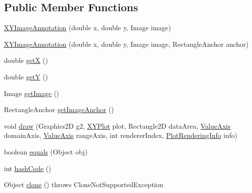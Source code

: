 \subsection*{Public Member Functions}
\begin{DoxyCompactItemize}
\item 
\mbox{\hyperlink{classorg_1_1jfree_1_1chart_1_1annotations_1_1_x_y_image_annotation_a29e84ffa5417925c2b760651d65240c7}{X\+Y\+Image\+Annotation}} (double x, double y, Image image)
\item 
\mbox{\hyperlink{classorg_1_1jfree_1_1chart_1_1annotations_1_1_x_y_image_annotation_a66b091b9414ad06c4276c03c62d2fca5}{X\+Y\+Image\+Annotation}} (double x, double y, Image image, Rectangle\+Anchor anchor)
\item 
double \mbox{\hyperlink{classorg_1_1jfree_1_1chart_1_1annotations_1_1_x_y_image_annotation_ad77b6ae97c4b5eab5f3a0ba95f9331c1}{getX}} ()
\item 
double \mbox{\hyperlink{classorg_1_1jfree_1_1chart_1_1annotations_1_1_x_y_image_annotation_acbc4b1c73134c8c7d7e04c0323c85c42}{getY}} ()
\item 
Image \mbox{\hyperlink{classorg_1_1jfree_1_1chart_1_1annotations_1_1_x_y_image_annotation_a4158e32d650804e61aab81edd3bce15a}{get\+Image}} ()
\item 
Rectangle\+Anchor \mbox{\hyperlink{classorg_1_1jfree_1_1chart_1_1annotations_1_1_x_y_image_annotation_a2149a26b8d4163b1f6ccce3b8ddf9e83}{get\+Image\+Anchor}} ()
\item 
void \mbox{\hyperlink{classorg_1_1jfree_1_1chart_1_1annotations_1_1_x_y_image_annotation_ae60cac497a5354b0640499084046637d}{draw}} (Graphics2D g2, \mbox{\hyperlink{classorg_1_1jfree_1_1chart_1_1plot_1_1_x_y_plot}{X\+Y\+Plot}} plot, Rectangle2D data\+Area, \mbox{\hyperlink{classorg_1_1jfree_1_1chart_1_1axis_1_1_value_axis}{Value\+Axis}} domain\+Axis, \mbox{\hyperlink{classorg_1_1jfree_1_1chart_1_1axis_1_1_value_axis}{Value\+Axis}} range\+Axis, int renderer\+Index, \mbox{\hyperlink{classorg_1_1jfree_1_1chart_1_1plot_1_1_plot_rendering_info}{Plot\+Rendering\+Info}} info)
\item 
boolean \mbox{\hyperlink{classorg_1_1jfree_1_1chart_1_1annotations_1_1_x_y_image_annotation_aec33b4cbf0a993645535408d28692f6b}{equals}} (Object obj)
\item 
int \mbox{\hyperlink{classorg_1_1jfree_1_1chart_1_1annotations_1_1_x_y_image_annotation_acf32ed3da18593fd2d5871c0bfd1ca7b}{hash\+Code}} ()
\item 
Object \mbox{\hyperlink{classorg_1_1jfree_1_1chart_1_1annotations_1_1_x_y_image_annotation_acf5922efb01896ecdd303c236d70adaa}{clone}} ()  throws Clone\+Not\+Supported\+Exception 
\end{DoxyCompactItemize}
